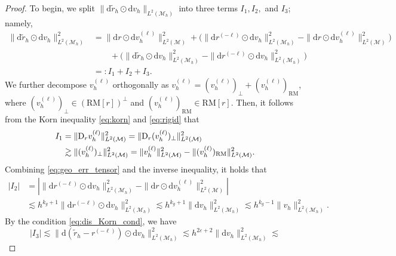 \documentclass[11pt,a4paper,oneside,reqno]{amsart}
\theoremstyle{definition}
\theoremstyle{plain}
\numberwithin{theorem}{section}
\numberwithin{proposition}{section}
\numberwithin{lemma}{section}
\numberwithin{equation}{section}
\newcommand{\Man}{\mathcal{M}}
\newcommand{\RM}{\mathrm{RM}}
\begin{document}
\begin{proof}
To begin, we split $\| \mathrm{d} \tilde r_h \odot \mathrm{d} v_h \|_{L^2(\Man_h)} $
into three terms $I_1, I_2,$ and $I_3$; namely,  
\[ \begin{aligned}
    \| \mathrm{d} \tilde r_h \odot \mathrm{d} v_h \|_{L^2(\Man_h)}^2 
    & = \| \mathrm{d} r \odot \mathrm{d} v_h^{(\ell)} \|_{L^2(\Man)}^2 
    + \big(\| \mathrm{d} r^{(-\ell)} \odot \mathrm{d} v_h \|_{L^2(\Man_h)}^2  - \| \mathrm{d} r \odot \mathrm{d} v_h^{(\ell)} \|_{L^2(\Man)}^2 \big) \\ 
    &\qquad + \big(  \| \mathrm{d} \tilde r_h \odot \mathrm{d} v_h \|_{L^2(\Man_h)}^2  - \| \mathrm{d} r^{(-\ell)} \odot \mathrm{d} v_h \|_{L^2(\Man_h)}^2 \big) \\
    & =: I_1 + I_2 + I_3. 
\end{aligned} \]
    We further decompose \(v_h^{(\ell)}\) orthogonally as \(v_h^{(\ell)} = (v_h^{(\ell)})_{\perp} + (v_h^{(\ell)})_{\mathrm{RM}}\), where \((v_h^{(\ell)})_{\perp} \in (\mathrm{RM}[r])^{\perp}\) and \((v_h^{(\ell)})_{\mathrm{RM}} \in \mathrm{RM}[r]\).
    Then, it follows from the Korn inequality \eqref{eq:korn} and \eqref{eq:rigid} that  
    \[ \begin{aligned}
        I_1 & = \| {\rm D}_r  v_h^{(\ell)} \|_{L^2(\Man)}^2  
        = \| {\rm D}_r (v_h^{(\ell)})_{\perp} \|_{L^2(\Man)}^2 
        \\
        & \gtrsim \| (v_h^{(\ell)})_{\perp}\|_{L^2(\Man)}^2 = 
        \| v_h^{(\ell)}\|_{L^2(\Man)}^2 - \| (v_h^{(\ell)})_{\RM}\|_{L^2(\Man)}^2. 
    \end{aligned}\]
    Combining \eqref{eq:geo_err_tensor} and the inverse inequality, it holds that
    \[ \begin{aligned}
        |I_2| & = | \| \mathrm{d} r^{(-\ell)} \odot \mathrm{d} v_h \|_{L^2(\Man_h)}^2  - \| \mathrm{d} r \odot \mathrm{d} v_h^{(\ell)} \|_{L^2(\Man)}^2 |  \\ 
        & \lesssim h^{k_g+1} \| \mathrm{d} r^{(-\ell)} \odot  \mathrm{d} v_h\|_{L^2(\Man_h)}^2 \lesssim h^{k_g+1} \|\mathrm{d} v_h\|_{L^2(\Man_h)}^2 \lesssim h^{k_g - 1} \| v_h\|_{L^2(\Man_h)}^2. 
    \end{aligned} \]
    By the condition \eqref{eq:dis_Korn_cond}, we have 
    \[ |I_3| 
    \lesssim \| \mathrm{d} (\tilde r_h - r^{(-\ell)}) \odot \mathrm{d} v_h \|_{L^2(\Man_h)}^2
    \lesssim h^{2\varepsilon + 2} \|\mathrm{d} v_h\|_{L^2(\Man_h)}^2 \lesssim 
\]
\end{proof}
\end{document}
